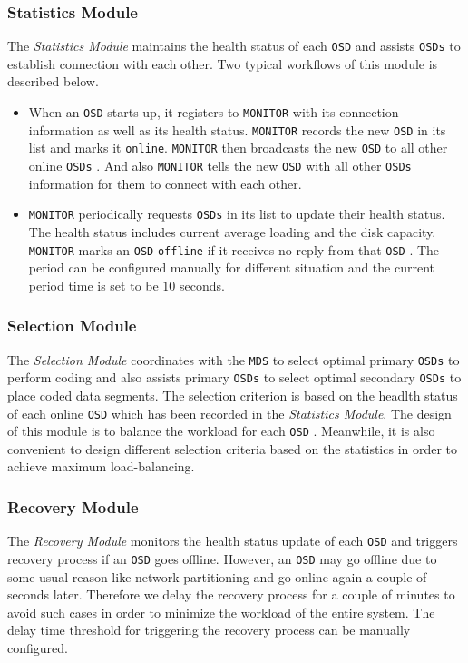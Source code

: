 \documentclass{article}
\def\osd{\texttt{OSD} }
\def\osds{\texttt{OSDs} }
\def\mds{\texttt{MDS} }
\def\monitor{\texttt{MONITOR} }
\begin{document}
\subsubsection{Statistics Module}
The \textit{Statistics Module} maintains the health status of 
each \osd and assists \osds to establish connection with each
other. Two typical workflows of this module is described below.
\begin{itemize}
	\item When an \osd starts up, it registers to \monitor with its
		connection information as well as its health status. \monitor records
		the new \osd in its list and marks it \texttt{online}. \monitor then
		broadcasts the new \osd to all other online \osds. And also \monitor
		tells the new \osd with all other \osds information for them 
		to connect with each other. 
	\item \monitor periodically requests \osds in its list to update their
		health status. The health status includes current average loading and
		the disk capacity. \monitor marks an \osd \texttt{offline} if it
		receives no reply from that \osd. 
		The period can be configured manually for different
		situation and the current period time is set to be $10$ seconds.
\end{itemize}

\subsubsection{Selection Module}
The \textit{Selection Module} coordinates with the \mds to select
optimal primary \osds to perform coding and also assists primary 
\osds to select optimal secondary \osds to place coded data segments.
The selection criterion is based on the headlth
status of each online \osd which has been recorded in the 
\textit{Statistics Module}. The design of this module is to balance the workload
for each \osd. Meanwhile, it is also convenient to design different 
selection criteria based on
the statistics in order to achieve maximum load-balancing.

\subsubsection{Recovery Module}
The \textit{Recovery Module} monitors the health status update of each \osd and
triggers recovery process if an \osd goes offline. However, an \osd may go offline
due to some usual reason like network partitioning and go online again a couple 
of seconds later. Therefore we delay the recovery process for a couple of minutes
to avoid such cases in order to minimize the workload of the entire system. The
delay time threshold for triggering the recovery process can be manually 
configured.
\end{document}
